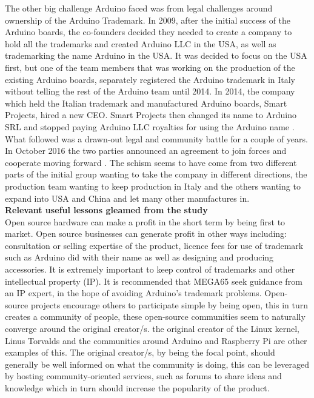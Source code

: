 The other big challenge Arduino faced was from legal challenges around ownership of the Arduino Trademark. In 2009, after the initial success of the Arduino boards, the co-founders decided they needed to create a company to hold all the trademarks and created Arduino LLC in the USA, as well as trademarking the name Arduino in the USA. It was decided to focus on the USA first, but one of the team members that was working on the production of the existing Arduino boards, separately registered the Arduino trademark in Italy without telling the rest of the Arduino team until 2014. In 2014, the company which held the Italian trademark and manufactured Arduino boards, Smart Projects, hired a new CEO. Smart Projects then changed its name to Arduino SRL and stopped paying Arduino LLC royalties for using the Arduino name 
\cite{RN115}. What followed was a drawn-out legal and community battle for a couple of years. In October 2016 the two parties announced an agreement to join forces and cooperate moving forward
\cite{RN116}. The schism seems to have come from two different parts of the initial group wanting to take the company in different directions, the production team wanting to keep production in Italy and the others wanting to expand into USA and China and let many other manufactures in. \\

\textbf{Relevant useful lessons gleamed from the study}\\
Open source hardware can make a profit in the short term by being first to market.
Open source businesses can generate profit in other ways including: consultation or selling expertise of the product, licence fees for use of trademark such as Arduino did with their name as well as designing and producing accessories.
It is extremely important to keep control of trademarks and other intellectual property (IP). It is recommended that MEGA65 seek guidance from an IP expert, in the hope of avoiding Arduino's trademark problems. 
Open-source projects encourage others to participate simple by being open, this in turn creates a community of people, these open-source communities seem to naturally converge around the original creator/s. the original creator of the Linux kernel, Linus Torvalds and the communities around Arduino and Raspberry Pi are other examples of this. The original creator/s, by being the focal point, should generally be well informed on what the community is doing, this can be leveraged by hosting community-oriented services, such as forums to share ideas and knowledge which in turn should increase the popularity of the product. \\


